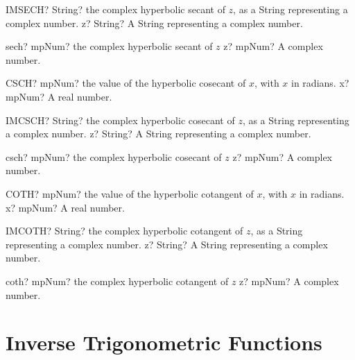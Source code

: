 \documentclass[12pt,a4paper,openany]{book}
\begin{document}
\begin{mpFunctionsExtract}
\mpWorksheetFunctionOneNotImplemented
{IMSECH? String? the complex hyperbolic secant of $z$, as a String representing a complex number.}
{z? String? A String representing a complex number.}
\end{mpFunctionsExtract}

\begin{mpFunctionsExtract}
\mpFunctionOne
{sech? mpNum? the complex hyperbolic secant of $z$}
{z? mpNum? A complex number.}
\end{mpFunctionsExtract}

\begin{mpFunctionsExtract}
\mpWorksheetFunctionOneNotImplemented
{CSCH? mpNum? the value of the hyperbolic cosecant of $x$, with $x$ in radians.}
{x? mpNum? A real number.}
\end{mpFunctionsExtract}

\begin{mpFunctionsExtract}
\mpWorksheetFunctionOneNotImplemented
{IMCSCH? String? the complex hyperbolic cosecant of $z$, as a String representing a complex number.}
{z? String? A String representing a complex number.}
\end{mpFunctionsExtract}

\begin{mpFunctionsExtract}
\mpFunctionOne
{csch? mpNum? the complex hyperbolic cosecant of $z$}
{z? mpNum? A complex number.}
\end{mpFunctionsExtract}

\begin{mpFunctionsExtract}
\mpWorksheetFunctionOneNotImplemented
{COTH? mpNum? the value of the hyperbolic cotangent of $x$, with $x$ in radians.}
{x? mpNum? A real number.}
\end{mpFunctionsExtract}

\begin{mpFunctionsExtract}
\mpWorksheetFunctionOneNotImplemented
{IMCOTH? String? the complex hyperbolic cotangent of $z$, as a String representing a complex number.}
{z? String? A String representing a complex number.}
\end{mpFunctionsExtract}

\begin{mpFunctionsExtract}
\mpFunctionOne
{coth? mpNum? the complex hyperbolic cotangent of $z$}
{z? mpNum? A complex number.}
\end{mpFunctionsExtract}

\section{Inverse Trigonometric Functions}
\end{document}
